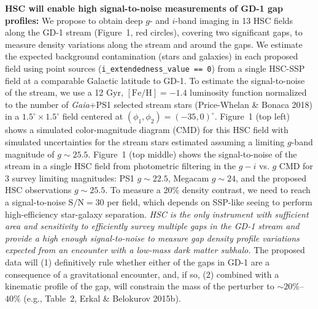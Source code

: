 \documentclass[11pt]{article}
\begin{document}
\textbf{HSC will enable high signal-to-noise measurements of GD-1 gap profiles:}
We propose to obtain deep $g$- and $i$-band imaging in 13 HSC fields along the GD-1 stream (Figure~1, red circles), covering two significant gaps, to measure density variations along the stream and around the gaps.
We estimate the expected background contamination (stars and galaxies) in each proposed field using point sources (\texttt{i\_extendedness\_value == 0}) from a single HSC-SSP field at a comparable Galactic latitude to GD-1.
To estimate the signal-to-noise of the stream, we use a 12 Gyr, $[\textrm{Fe}/\textrm{H}] = -1.4$ luminosity function normalized to the number of \textit{Gaia}+PS1 selected stream stars (Price-Whelan \& Bonaca 2018) in a $1.5^\circ \times 1.5^\circ$ field centered at $(\phi_1, \phi_2) = (-35, 0)^\circ$.
Figure~1 (top left) shows a simulated color-magnitude diagram (CMD) for this HSC field with simulated uncertainties for the stream stars estimated assuming a limiting $g$-band magnitude of $g \sim 25.5$.
Figure~1 (top middle) shows the signal-to-noise of the stream in a single HSC field from photometric filtering in the $g-i$ vs. $g$ CMD for 3 survey limiting magnitudes: PS1 $g \sim 22.5$, Megacam $g \sim 24$, and the proposed HSC observations $g \sim 25.5$.
To measure a 20\% density contrast, we need to reach a signal-to-noise $\textrm{S}/\textrm{N} = 30$ per field, which depends on SSP-like seeing to perform high-efficiency star-galaxy separation.
\emph{HSC is the only instrument with sufficient area and sensitivity to efficiently survey multiple gaps in the GD-1 stream and provide a high enough signal-to-noise to measure gap density profile variations expected from an encounter with a low-mass dark matter subhalo.}
The proposed data will (1) definitively rule whether either of the gaps in GD-1 are a consequence of a gravitational encounter, and, if so, (2) combined with a kinematic profile of the gap, will constrain the mass of the perturber to $\sim 20\%$--$40\%$ (e.g., Table~2, Erkal \& Belokurov 2015b).
\end{document}
